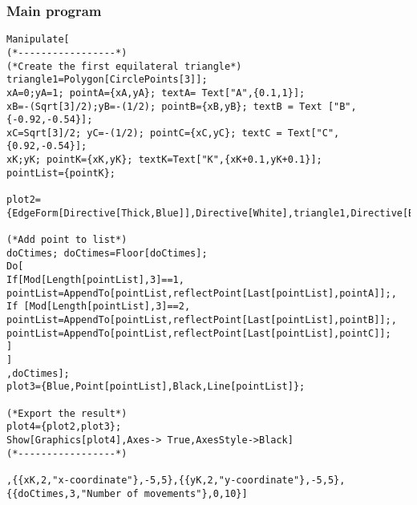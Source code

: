 \documentclass[a4paper,11pt, a4paper]{article}
\begin{document}
\subsubsection{Main program}

\lstset{language=Mathematica}
\begin{lstlisting}
Manipulate[
(*-----------------*)
(*Create the first equilateral triangle*)
triangle1=Polygon[CirclePoints[3]];
xA=0;yA=1; pointA={xA,yA}; textA= Text["A",{0.1,1}];
xB=-(Sqrt[3]/2);yB=-(1/2); pointB={xB,yB}; textB = Text ["B",{-0.92,-0.54}];
xC=Sqrt[3]/2; yC=-(1/2); pointC={xC,yC}; textC = Text["C",{0.92,-0.54}];
xK;yK; pointK={xK,yK}; textK=Text["K",{xK+0.1,yK+0.1}];
pointList={pointK};

plot2={EdgeForm[Directive[Thick,Blue]],Directive[White],triangle1,Directive[Black],Point[pointA],Point[pointB],Point[pointC],textA,textB,textC,PointSize[0.02],Point[pointK],textK};

(*Add point to list*)
doCtimes; doCtimes=Floor[doCtimes];
Do[
If[Mod[Length[pointList],3]==1,
pointList=AppendTo[pointList,reflectPoint[Last[pointList],pointA]];,
If [Mod[Length[pointList],3]==2,
pointList=AppendTo[pointList,reflectPoint[Last[pointList],pointB]];,
pointList=AppendTo[pointList,reflectPoint[Last[pointList],pointC]];
]
]
,doCtimes];
plot3={Blue,Point[pointList],Black,Line[pointList]};

(*Export the result*)
plot4={plot2,plot3};
Show[Graphics[plot4],Axes-> True,AxesStyle->Black]
(*-----------------*)

,{{xK,2,"x-coordinate"},-5,5},{{yK,2,"y-coordinate"},-5,5},{{doCtimes,3,"Number of movements"},0,10}]
\end{lstlisting}
\end{document}
